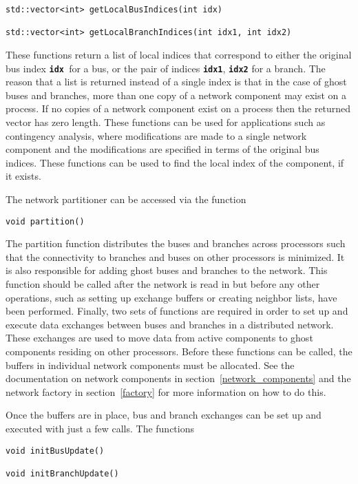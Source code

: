 {
\color{red}
\begin{Verbatim}[fontseries=b]
std::vector<int> getLocalBusIndices(int idx)

std::vector<int> getLocalBranchIndices(int idx1, int idx2)
\end{Verbatim}
}

These functions return a list of local indices that correspond to either the original bus index \texttt{\textbf{idx }}for a bus, or the pair of indices \texttt{\textbf{idx1}}, \texttt{\textbf{idx2}} for a branch. The reason that a list is returned instead of a single index is that in the case of ghost buses and branches, more than one copy of a network component may exist on a process. If no copies of a network component exist on a process then the returned vector has zero length. These functions can be used for applications such as contingency analysis, where modifications are made to a single network component and the modifications are specified in terms of the original bus indices. These functions can be used to find the local index of the component, if it exists. 

The network partitioner can be accessed via the function

{
\color{red}
\begin{Verbatim}[fontseries=b]
void partition()
\end{Verbatim}
}

The partition function distributes the buses and branches across processors such that the connectivity to branches and buses on other processors is minimized. It is also responsible for adding ghost buses and branches to the network. This function should be called after the network is read in but before any other operations, such as setting up exchange buffers or creating neighbor lists, have been performed.
Finally, two sets of functions are required in order to set up and execute data
exchanges between buses and branches in a distributed network. These exchanges
are used to move data from active components to ghost components residing on
other processors. Before these functions can be called, the buffers in
individual network components must be allocated. See the documentation on
network components in section~\ref{network_components} and the network factory
in section~\ref{factory} for more information on how to do this.

Once the buffers are in place, bus and branch exchanges can be set up and executed with just a few calls. The functions

{
\color{red}
\begin{Verbatim}[fontseries=b]
void initBusUpdate()

void initBranchUpdate()
\end{Verbatim}
}


